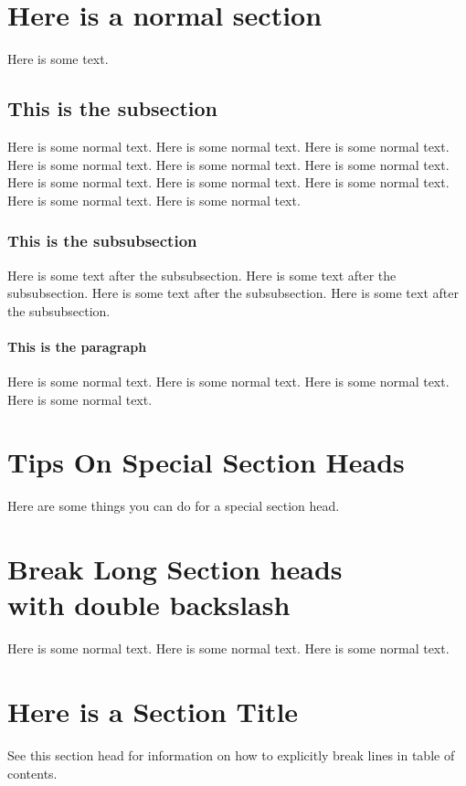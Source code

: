 \documentclass{book}
\begin{document}
\section{Here is a normal section}
Here is some text.

\subsection{This is the subsection}
Here is some normal text.
Here is some normal text.
Here is some normal text.
Here is some normal text.
Here is some normal text.
Here is some normal text.
Here is some normal text.
Here is some normal text.
Here is some normal text.
Here is some normal text.
Here is some normal text.


\subsubsection{This is the subsubsection}
Here is some text after the subsubsection.
Here is some text after the subsubsection.
Here is some text after the subsubsection.
Here is some text after the subsubsection.

\paragraph{This is the paragraph}
Here is some normal text.
Here is some normal text.
Here is some normal text.
Here is some normal text.

\section{Tips On Special Section Heads}
Here are some things you can do for a special
section head.

\section[This Version of Section Head will be sent Contents]
{Break Long Section heads\\ with double backslash}
Here is some normal text.
Here is some normal text.
Here is some normal text.

 \section[This show how to explicitly break lines
\string\hfill\string\break\space in Table of Contents]
{Here is a Section Title}
See this section head for information on how to explicitly break lines in
table of contents.
\end{document}
